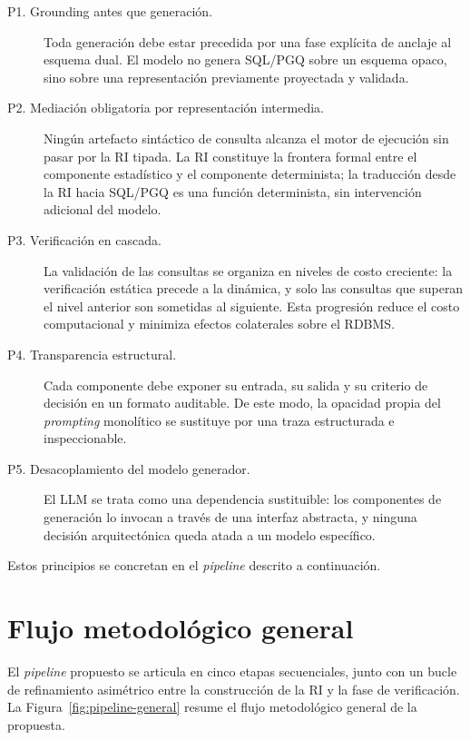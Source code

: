 \begin{description}
    \item[P1. Grounding antes que generación.] Toda generación debe estar
    precedida por una fase explícita de anclaje al esquema dual. El modelo no
    genera \ac{SQL}/\ac{PGQ} sobre un esquema opaco, sino sobre una
    representación previamente proyectada y validada.

    \item[P2. Mediación obligatoria por representación intermedia.] Ningún
    artefacto sintáctico de consulta alcanza el motor de ejecución sin pasar
    por la \ac{RI} tipada. La \ac{RI} constituye la frontera formal entre el %
    componente estadístico y el componente determinista; la traducción desde
    la \ac{RI} hacia \ac{SQL}/\ac{PGQ} es una función determinista, sin
    intervención adicional del modelo.

    \item[P3. Verificación en cascada.] La validación de las consultas se
    organiza en niveles de costo creciente: la verificación estática precede
    a la dinámica, y solo las consultas que superan el nivel anterior son
    sometidas al siguiente. Esta progresión reduce el costo computacional y
    minimiza efectos colaterales sobre el \ac{RDBMS}.

    \item[P4. Transparencia estructural.] Cada componente debe exponer su
    entrada, su salida y su criterio de decisión en un formato auditable. De
    este modo, la opacidad propia del \emph{prompting} monolítico se sustituye
    por una traza estructurada e inspeccionable.

    \item[P5. Desacoplamiento del modelo generador.] El \ac{LLM} se trata
    como una dependencia sustituible: los componentes de generación lo
    invocan a través de una interfaz abstracta, y ninguna decisión
    arquitectónica queda atada a un modelo específico.
\end{description}

Estos principios se concretan en el \emph{pipeline} descrito a continuación. %

\section{Flujo metodológico general}
\label{sec:prop-pipeline}

El \emph{pipeline} propuesto se articula en cinco etapas secuenciales, junto %
con un bucle de refinamiento asimétrico entre la construcción de la
\ac{RI} y la fase de verificación. La
Figura~\ref{fig:pipeline-general} resume el flujo metodológico general de la
propuesta.

